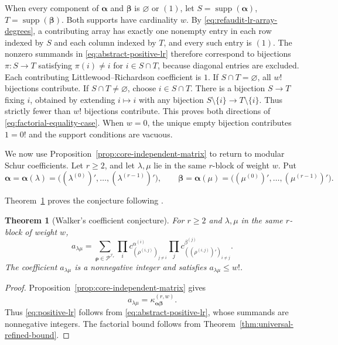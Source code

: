 \documentclass[12pt,reqno,a4paper]{amsart}
\numberwithin{equation}{section}
\numberwithin{figure}{section}
\theoremstyle{plain}
\newtheorem{theorem}{Theorem}[section]
\theoremstyle{definition}
\begin{document}
When every component of $\boldsymbol\alpha$ and
$\boldsymbol\beta$ is $\varnothing$ or $(1)$, let
$S=\operatorname{supp}(\boldsymbol\alpha)$,
$T=\operatorname{supp}(\boldsymbol\beta)$.
Both supports have cardinality $w$.  By
\eqref{eq:refaudit-lr-array-degrees}, a contributing array has
exactly one nonempty entry in each row indexed by $S$ and each
column indexed by $T$, and every such entry is $(1)$.
The nonzero summands in \eqref{eq:abstract-positive-lr} therefore
correspond to bijections $\pi:S\to T$ satisfying $\pi(i)\ne i$
for $i\in S\cap T$, because diagonal entries are excluded.
Each contributing Littlewood--Richardson coefficient is $1$.
If $S\cap T=\varnothing$, all $w!$ bijections contribute.
If $S\cap T\ne\varnothing$, choose $i\in S\cap T$.
There is a bijection $S\to T$ fixing $i$, obtained by extending
$i\mapsto i$ with any bijection $S\setminus\{i\}\to T\setminus\{i\}$.
Thus strictly fewer than $w!$ bijections contribute. This proves both directions of
\eqref{eq:factorial-equality-case}.  When $w=0$, the unique empty
bijection contributes $1=0!$ and the support conditions are vacuous.

We now use Proposition~\ref{prop:core-independent-matrix} to return
to modular Schur coefficients.  Let $r\geq2$, and let
$\lambda,\mu$ lie in the same $r$-block of
weight $w$.  Put
\[
 \boldsymbol\alpha=\boldsymbol\alpha(\lambda)
 =\bigl((\lambda^{(0)})',\ldots,(\lambda^{(r-1)})'\bigr),
 \qquad
 \boldsymbol\beta=\boldsymbol\alpha(\mu)
 =\bigl((\mu^{(0)})',\ldots,(\mu^{(r-1)})'\bigr).
\]

Theorem~\ref{thm:coefficient-conjecture} proves the conjecture following \cite[Corollary~2.10, p.~586]{Walker}.

\begin{theorem}[Walker's coefficient conjecture]
\label{thm:coefficient-conjecture}
For $r\geq2$ and $\lambda,\mu$ in the same $r$-block of weight $w$,
\begin{equation}\label{eq:positive-lr}
 a_{\lambda\mu}
 =\sum_{\boldsymbol\rho\in\mathscr P^{\mathcal I_r}}
  \prod_i c^{\alpha^{(i)}}_{(\rho^{(i,j)})_{j\neq i}}
  \prod_j c^{\beta^{(j)}}_{((\rho^{(i,j)})')_{i\neq j}}.
\end{equation}
The coefficient $a_{\lambda\mu}$ is a nonnegative integer and
satisfies $a_{\lambda\mu}\leq w!$.
\end{theorem}

\begin{proof}
Proposition~\ref{prop:core-independent-matrix} gives
\[
 a_{\lambda\mu}
 =\kappa^{(r,w)}_{\boldsymbol\alpha\boldsymbol\beta}.
\]
Thus \eqref{eq:positive-lr} follows from
\eqref{eq:abstract-positive-lr}, whose summands are nonnegative
integers.  The factorial bound follows from
Theorem~\ref{thm:universal-refined-bound}.
\end{proof}
\end{document}
